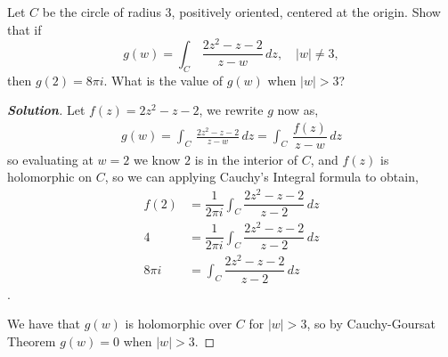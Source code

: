 \documentclass[11pt]{article}
\newenvironment{problem}[2][Problem\!]{\begin{trivlist}
\item[\hskip \labelsep {\bfseries #1}\hskip \labelsep {\bfseries #2}]}{\end{trivlist}}
\newenvironment{solution}{\begin{proof}[\textbf{\textit{Solution}}] }{\end{proof}}
\newcommand{\abs}[1]{\left\lvert#1\right\rvert} %
\begin{document}
\begin{problem}{8.2}
Let $C$ be the circle of radius $3$, positively oriented, centered at the origin. Show that if
\[g(w) = \int_C\, \frac{2z^2 - z - 2}{z - w}\,dz,\quad \abs{w} \neq 3,\]
then $g(2) = 8\pi i$. What is the value of $g(w)$ when $|w| > 3$?
\end{problem}
\begin{solution}
    Let $f(z) = 2z^{2} -z - 2$, we rewrite $g$ now as,
    \begin{align*}
        g(w) = \int_C\, \frac{2z^2 - z - 2}{z - w}\,d z = \int_C\, \dfrac{f(z)}{z - w} \, d z 
    \end{align*}
    so evaluating at $w = 2$ we know $2$ is in the interior of $C$, and $f(z)$ is holomorphic on $C$, so we can applying Cauchy's Integral formula to obtain,
    \begin{align*}
        f(2) &= \dfrac{1}{2\pi i}\int_C \dfrac{2z^{2} - z -2}{z - 2 }\, d z  \\
        4 &= \dfrac{1}{2\pi i} \int_C \dfrac{2z^{2} - z -2}{z - 2 }\, d z \\
        8\pi i &=  \int_C \dfrac{2z^{2} - z -2}{z - 2 }\, d z
    \end{align*}.

    We have that $g(w)$ is holomorphic over $C$ for $\abs{w} > 3$, so by Cauchy-Goursat Theorem $g(w) = 0$ when $\abs{w} > 3$.
\end{solution}

\newpage  %
\end{document}
